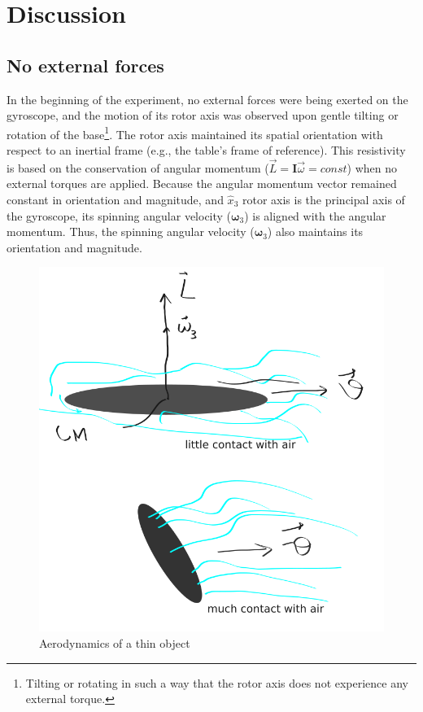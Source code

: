 \section{Discussion} \label{sec:discussion}

\subsection{No external forces}
\label{sec:discussion:no}

In the beginning of the experiment, no external forces were being exerted on the gyroscope, and the motion of its rotor axis was observed upon gentle tilting or rotation of the base\footnote{Tilting or rotating in such a way that the rotor axis does not experience any external torque.}. The rotor axis maintained its spatial orientation with respect to an inertial frame (e.g., the table's frame of reference). This resistivity is based on the conservation of angular momentum ($\vec{L} = \mathbf{I}\vec{\omega} = const$) when no external torques are applied. Because the angular momentum vector remained constant in orientation and magnitude, and $\hat{x}_{3}$ rotor axis is the principal axis of the gyroscope, its spinning angular velocity ($\boldsymbol\omega_{3}$) is aligned with the angular momentum. Thus, the spinning angular velocity ($\boldsymbol\omega_{3}$) also maintains its orientation and magnitude.

\begin{figure}[H]
  \centering
  \includegraphics[width=\columnwidth]{gyroscope/images/thin}
  \caption{Aerodynamics of a thin object }
  \label{fig:discussion:thin}
\end{figure}


